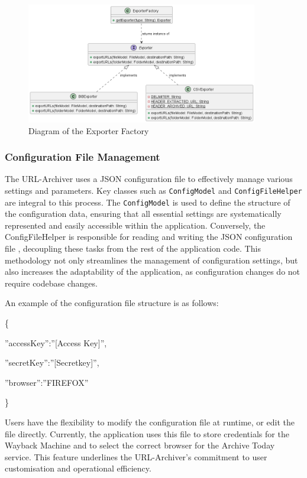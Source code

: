 \begin{figure}[h!]
    \center
    \includegraphics[width=0.9\textwidth]{pictures/ExporterFactory-0.png}
    \caption{Diagram of the Exporter Factory}
    \label{fig:ExporterFactory_Diagram}
\end{figure}

\subsubsection{Configuration File Management}
The URL-Archiver uses a JSON configuration file  to effectively manage various settings and parameters. Key classes such as \texttt{ConfigModel} and \texttt{ConfigFileHelper} are integral to this process. The \texttt{ConfigModel} is used to define the structure of the configuration data, ensuring that all essential settings are systematically represented and easily accessible within the application. Conversely, the ConfigFileHelper is responsible for reading and writing the JSON configuration file , decoupling these tasks from the rest of the application code. This methodology not only streamlines the management of configuration settings, but also increases the adaptability of the application, as configuration changes do not require codebase changes.

An example of the configuration file  structure is as follows:

\{

\quad''accessKey'':''[Access Key]'',

\quad''secretKey'':''[Secretkey]'',

\quad''browser'':''FIREFOX''

\}

Users have the flexibility to modify the configuration file  at runtime, or edit the file directly. Currently, the application uses this file to store credentials for the Wayback Machine and to select the correct browser for the Archive Today service. This feature underlines the URL-Archiver's commitment to user customisation and operational efficiency.


